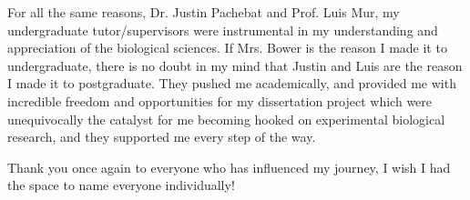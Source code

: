 For all the same reasons, Dr. Justin Pachebat and Prof. Luis Mur, my undergraduate tutor/supervisors were instrumental in my understanding and appreciation of the biological sciences. If Mrs. Bower is the reason I made it to undergraduate, there is no doubt in my mind that Justin and Luis are the reason I made it to postgraduate. They pushed me academically, and provided me with incredible freedom and opportunities for my dissertation project which were unequivocally the catalyst for me becoming hooked on experimental biological research, and they supported me every step of the way.

Thank you once again to everyone who has influenced my journey, I wish I had the space to name everyone individually!

\vfill
